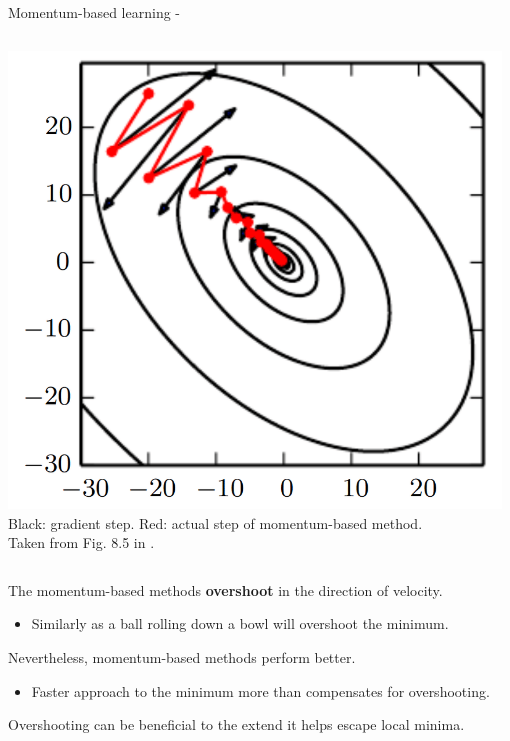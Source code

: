 \begin{frame}[t,allowframebreaks]{
    Momentum-based learning -}
\begin{columns}[t]
\begin{column}{0.40\textwidth}
\begin{center}
                \includegraphics[width=0.98\textwidth]
                    {./images/training_issues/goodfellow17_search_path_w_momentum.png}\\
                {\scriptsize
                  Black: \gls{gradient} step.
                  Red: actual step of \gls{momentum}-based method.\\
                }
                {\tiny 
                    \color{col:attribution} 
                    Taken from Fig. 8.5 in \cite{Goodfellow:2017MITDL}.\\    
                }
            \end{center}                
        \end{column}
    \end{columns}

    \framebreak


    The \gls{momentum}-based methods {\bf overshoot} in 
    the direction of \gls{velocity}.
    \begin{itemize}
        \small
        \item Similarly as a ball rolling down a bowl will overshoot the minimum.
    \end{itemize}    
    \vspace{0.1cm}
    Nevertheless, \gls{momentum}-based methods perform better.
    \begin{itemize}
        \small
        \item Faster approach to the minimum
        more than compensates for overshooting.
    \end{itemize}    
    \vspace{0.1cm}
    Overshooting can be beneficial to the extend it helps escape local minima.\\


\end{frame}
